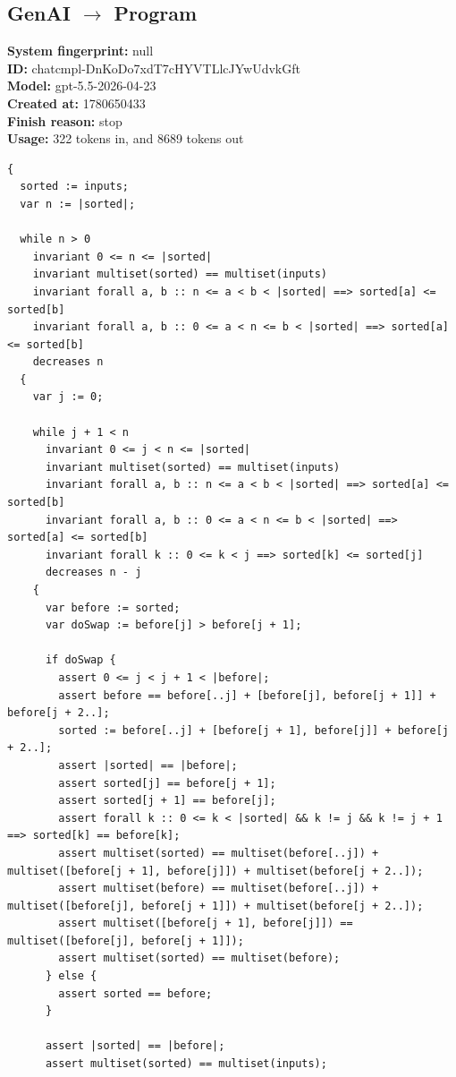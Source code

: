 \documentclass{article}
\begin{document}
\subsection*{GenAI $\rightarrow$ Program}
\textbf{System fingerprint: }null
\\\textbf{ID: }chatcmpl-DnKoDo7xdT7cHYVTLlcJYwUdvkGft
\\\textbf{Model: }gpt-5.5-2026-04-23
\\\textbf{Created at: }1780650433
\\\textbf{Finish reason: }stop
\\\textbf{Usage: }322 tokens in, and 8689 tokens out
\begin{lstlisting}
{
  sorted := inputs;
  var n := |sorted|;

  while n > 0
    invariant 0 <= n <= |sorted|
    invariant multiset(sorted) == multiset(inputs)
    invariant forall a, b :: n <= a < b < |sorted| ==> sorted[a] <= sorted[b]
    invariant forall a, b :: 0 <= a < n <= b < |sorted| ==> sorted[a] <= sorted[b]
    decreases n
  {
    var j := 0;

    while j + 1 < n
      invariant 0 <= j < n <= |sorted|
      invariant multiset(sorted) == multiset(inputs)
      invariant forall a, b :: n <= a < b < |sorted| ==> sorted[a] <= sorted[b]
      invariant forall a, b :: 0 <= a < n <= b < |sorted| ==> sorted[a] <= sorted[b]
      invariant forall k :: 0 <= k < j ==> sorted[k] <= sorted[j]
      decreases n - j
    {
      var before := sorted;
      var doSwap := before[j] > before[j + 1];

      if doSwap {
        assert 0 <= j < j + 1 < |before|;
        assert before == before[..j] + [before[j], before[j + 1]] + before[j + 2..];
        sorted := before[..j] + [before[j + 1], before[j]] + before[j + 2..];
        assert |sorted| == |before|;
        assert sorted[j] == before[j + 1];
        assert sorted[j + 1] == before[j];
        assert forall k :: 0 <= k < |sorted| && k != j && k != j + 1 ==> sorted[k] == before[k];
        assert multiset(sorted) == multiset(before[..j]) + multiset([before[j + 1], before[j]]) + multiset(before[j + 2..]);
        assert multiset(before) == multiset(before[..j]) + multiset([before[j], before[j + 1]]) + multiset(before[j + 2..]);
        assert multiset([before[j + 1], before[j]]) == multiset([before[j], before[j + 1]]);
        assert multiset(sorted) == multiset(before);
      } else {
        assert sorted == before;
      }

      assert |sorted| == |before|;
      assert multiset(sorted) == multiset(inputs);


\end{lstlisting}
\end{document}

